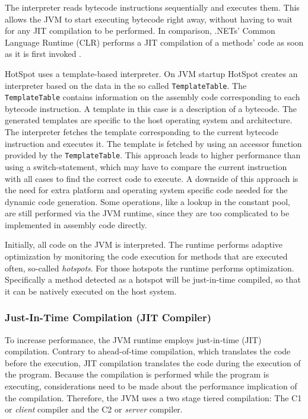 The interpreter reads bytecode instructions sequentially and executes them. This allows the JVM to start executing bytecode right away, without having to wait for any JIT compilation to be performed. In comparison, .NETs' Common Language Runtime (CLR) performs a JIT compilation of a methods' code as soon as it is first invoked \parencite{MicrosoftCILToNative}. 

HotSpot uses a template-based interpreter. On JVM startup HotSpot creates an interpreter based on the data in the so called \texttt{TemplateTable}. The \texttt{TemplateTable} contains information on the assembly code corresponding to each bytecode instruction. A template in this case is a description of a bytecode. The generated templates are specific to the host operating system and architecture. The interpreter fetches the template corresponding to the current bytecode instruction and executes it. The template is fetched by using an accessor function provided by the \texttt{TemplateTable}. This approach leads to higher performance than using a switch-statement, which may have to compare the current instruction with all cases to find the correct code to execute. A downside of this approach is the need for extra platform and operating system specific code needed for the dynamic code generation. Some operations, like a lookup in the constant pool, are still performed via the JVM runtime, since they are too complicated to be implemented in assembly code directly. 

Initially, all code on the JVM is interpreted. The runtime performs adaptive optimization by monitoring the code execution for methods that are executed often, so-called \textit{hotspots}. For those hotspots the runtime performs optimization. Specifically a method detected as a hotspot will be just-in-time compiled, so that it can be natively executed on the host system. 

\subsubsection{Just-In-Time Compilation (JIT Compiler)}

To increase performance, the JVM runtime employs just-in-time (JIT) compilation. Contrary to ahead-of-time compilation, which translates the code before the execution, JIT compilation translates the code during the execution of the program. Because the compilation is performed while the program is executing, considerations need to be made about the performance implication of the compilation. Therefore, the JVM uses a two stage tiered compilation: The C1 or \textit{client} compiler and the C2 or \textit{server} compiler.

